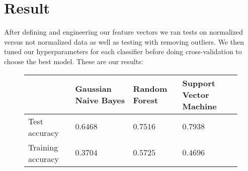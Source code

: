 \section{Result}

After defining and engineering our feature vectors we ran tests on normalized versus not normalized data as well as testing with removing outliers. We then tuned our hyperparameters for each classifier before doing cross-validation to choose the best model. These are our results:
\begin{figure}[!ht]
    \centering
    \begin{tabular}{|l|l|l|l|}
        \hline
        \rowcolor{gray!50}
        & Gaussian Naive Bayes & Random Forest & Support Vector Machine \\ \hline
        Test accuracy & $0.6468$ & $0.7516$ & $0.7938$ \\ \hline
        Training accuracy & $0.3704$ & $0.5725$ & $0.4696$ \\ \hline
    \end{tabular}
\end{figure}